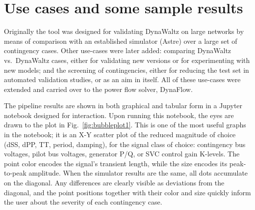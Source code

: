 \documentclass[conference]{IEEEtran}
\begin{document}
\section{Use cases and some sample results}

Originally the tool was designed for validating DynaWaltz on large
networks by means of comparison with an established simulator (Astre)
over a large set of contingency cases. Other use-cases were later
added: comparing DynaWaltz vs.\ DynaWaltz cases, either for validating
new versions or for experimenting with new models; and the screening
of contingencies, either for reducing the test set in automated
validation studies, or as an aim in itself.  All of these use-cases
were extended and carried over to the power flow solver, DynaFlow.

The pipeline results are shown in both graphical and tabular form in a
Jupyter notebook designed for interaction.  Upon running this
notebook, the eyes are drawn to the plot in
Fig.~\ref{fig:bubbleplot1}.  This is one of the most useful graphs
in the notebook; it is an X-Y scatter plot of the reduced magnitude of
choice (dSS, dPP, TT, period, damping), for the signal class of
choice: contingency bus voltages, pilot bus voltages, generator P/Q,
or SVC control gain K-levels. The point color encodes the signal's
transient length, while the size encodes its peak-to-peak amplitude.
When the simulator results are the same, all dots accumulate on the
diagonal. Any differences are clearly visible as deviations from the
diagonal, and the point positions together with their color and size
quickly inform the user about the severity of each contingency case.
\end{document}
